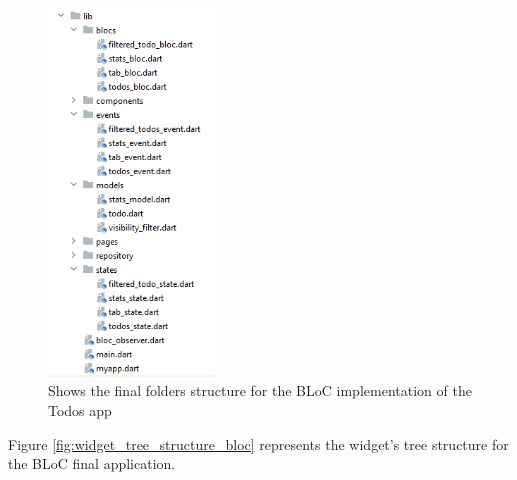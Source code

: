 \begin{figure}[H]
    \centering
    \includegraphics[width=0.4\textwidth]{Images/struttura_cartelle_bloc.png}
    \caption{Shows the final folders structure for the BLoC implementation of the Todos app}
    \label{fig:struttura_cartelle_bloc}
\end{figure}
Figure \ref{fig:widget_tree_structure_bloc}  represents the widget's tree structure for the BLoC final application. 

